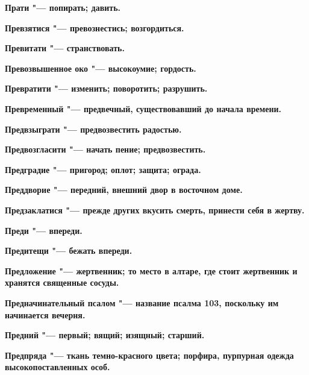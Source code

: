 \begin{multicols}{2}
\bfseries Прати\normalfont{} "--- попирать; давить. 




\bfseries Превзятися\normalfont{} "--- превознестись; возгордиться. 




\bfseries Превитати\normalfont{} "--- странствовать. 




\bfseries Превозвышенное око\normalfont{} "--- высокоумие; гордость. 




\bfseries Превратити\normalfont{} "--- изменить; поворотить; разрушить. 




\bfseries Превременный\normalfont{} "--- предвечный, существовавший до начала времени. 




\bfseries Предвзыграти\normalfont{} "--- предвозвестить радостью. 




\bfseries Предвозгласити\normalfont{} "--- начать пение; предвозвестить. 




\bfseries Предградие\normalfont{} "--- пригород; оплот; защита; ограда. 




\bfseries Преддворие\normalfont{} "--- передний, внешний двор в восточном доме. 




\bfseries Предзаклатися\normalfont{} "--- прежде других вкусить смерть, принести себя в жертву. 




\bfseries Преди\normalfont{} "--- впереди. 




\bfseries Предитещи\normalfont{} "--- бежать впереди. 




\bfseries Предложение\normalfont{} "--- жертвенник; то место в алтаре, где стоит жертвенник и хранятся священные сосуды. 




\bfseries Предначинательный псалом\normalfont{} "--- название псалма 103, поскольку им начинается вечерня. 




\bfseries Предний\normalfont{} "--- первый; вящий; изящный; старший. 




\bfseries Предпряда\normalfont{} "--- ткань темно-красного цвета; порфира, пурпурная одежда высокопоставленных особ. 





\end{multicols}
